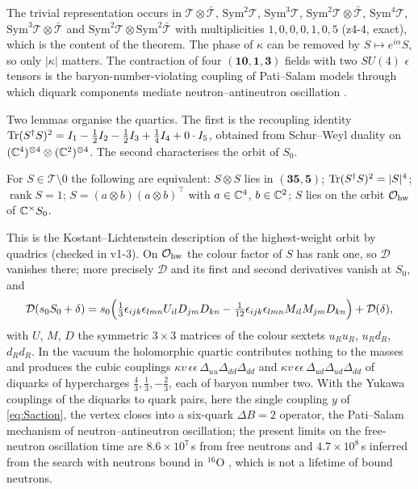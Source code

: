 The trivial representation occurs in $\mathcal T\otimes\bar{\mathcal T}$, $\mathrm{Sym}^2\mathcal T$, $\mathrm{Sym}^3\mathcal T$, $\mathrm{Sym}^2\mathcal T\otimes\bar{\mathcal T}$,
$\mathrm{Sym}^4\mathcal T$, $\mathrm{Sym}^3\mathcal T\otimes\bar{\mathcal T}$ and $\mathrm{Sym}^2\mathcal T\otimes\mathrm{Sym}^2\bar{\mathcal T}$ with multiplicities $1,0,0,0,1,0,5$ (z4-4, exact),
which is the content of the theorem. The phase of $\kappa$ can be removed by $S\mapsto e^{i\alpha}S$, so only $|\kappa|$ matters. The contraction of four
$(\mathbf{10},\mathbf1,\mathbf3)$ fields with two $SU(4)$ $\epsilon$ tensors is the baryon-number-violating coupling of Pati--Salam models through which diquark
components mediate neutron--antineutron oscillation \cite{MohapatraMarshak80,ChackoMohapatra99}.

Two lemmas organise the quartics. The first is the recoupling identity $\operatorname{Tr}(S^\dagger S)^2=I_1-\tfrac12I_2-\tfrac12I_3+\tfrac14I_4+0\cdot I_5$, obtained from
Schur--Weyl duality on $(\mathbb{C}^4)^{\otimes4}\otimes(\mathbb{C}^2)^{\otimes4}$. The second characterises the orbit of $S_0$.

\begin{lemma}
\label{lem:hw}
For $S\in\mathcal T\setminus0$ the following are equivalent: $S\otimes S$ lies in $(\mathbf{35},\mathbf5)$; $\operatorname{Tr}(S^\dagger S)^2=|S|^4$; $\operatorname{rank}S=1$;
$S=(a\otimes b)(a\otimes b)^{\!\top}$ with $a\in\mathbb{C}^4$, $b\in\mathbb{C}^2$; $S$ lies on the orbit $\mathcal O_{\rm hw}$ of $\mathbb{C}^\times S_0$.
\end{lemma}

This is the Kostant--Lichtenstein description of the highest-weight orbit by quadrics \cite{Lichtenstein82} (checked in v1-3). On $\mathcal O_{\rm hw}$ the colour factor of $S$
has rank one, so $\mathcal D$ vanishes there; more precisely $\mathcal D$ and its first and second derivatives vanish at $S_0$, and
\[
\mathcal D(s_0S_0+\delta)=s_0\Bigl(\tfrac13\epsilon_{ijk}\epsilon_{lmn}U_{il}D_{jm}D_{kn}-\tfrac1{12}\epsilon_{ijk}\epsilon_{lmn}M_{il}M_{jm}D_{kn}\Bigr)+\mathcal D(\delta),
\]
with $U$, $M$, $D$ the symmetric $3\times3$ matrices of the colour sextets $u_Ru_R$, $u_Rd_R$, $d_Rd_R$. In the vacuum the holomorphic quartic contributes
nothing to the masses and produces the cubic couplings $\kappa v\,\epsilon\epsilon\,\Delta_{uu}\Delta_{dd}\Delta_{dd}$ and $\kappa v\,\epsilon\epsilon\,\Delta_{ud}\Delta_{ud}\Delta_{dd}$ of
diquarks of hypercharges $\tfrac43,\tfrac13,-\tfrac23$, each of baryon number two. With the Yukawa couplings of the diquarks to quark pairs, here the
single coupling $y$ of \eqref{eq:Saction}, the vertex closes into a six-quark $\Delta B=2$ operator, the Pati--Salam mechanism of neutron--antineutron
oscillation; the present limits on the free-neutron oscillation time are $8.6\times10^7$\,s from free neutrons \cite{BaldoCeolin94} and
$4.7\times10^8$\,s inferred from the search with neutrons bound in $^{16}$O \cite{SuperK21}, which is not a lifetime of bound neutrons.

